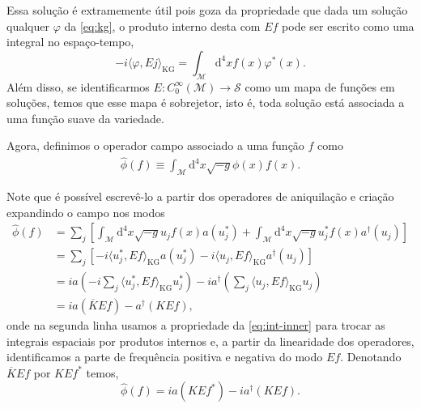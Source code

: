 \documentclass[12pt]{article}
\newcommand{\m}{\mathcal{M}}
\newcommand{\s}{\mathcal{S}}
\newcommand{\dd}{\mathrm{d}}
\newcommand{\innerkg}[2]{\langle#1,#2\rangle_{\text{KG}}}
\begin{document}
Essa solução é extramemente útil pois goza da propriedade que dada um solução qualquer \(\varphi\) da \cref{eq:kg}, o produto interno desta com \(Ef\) pode ser escrito como uma integral no espaço-tempo,
\begin{equation}
    -i\innerkg{\varphi}{Ej}=\int_\m\dd^4xf(x)\varphi^*(x).
    \label{eq:int-inner}
\end{equation}
Além disso, se identificarmos \(E:C_0^{\infty}(\m)\to\s\) como um mapa de funções em soluções, temos que esse mapa é sobrejetor, isto é, toda solução está associada a uma função suave da variedade.

Agora, definimos o operador campo associado a uma função \(f\) como
\begin{subequations}
    \begin{align}
        \hat{\phi}(f)\equiv\int_\m\dd^4x\sqrt{-g}\phi(x)f(x).
    \end{align}
\end{subequations}

Note que é possível escrevê-lo a partir dos operadores de aniquilação e criação expandindo o campo nos modos
\begin{subequations}
    \begin{align}
        \hat{\phi}(f)&=\sum_j\left[\int_\m\dd^4x\sqrt{-g}u_jf(x)a(u_j^*)+\int_\m\dd^4x\sqrt{-g}u_j^*f(x)a^{\dagger}(u_j)\right]\\
        &=\sum_j\left[-i\innerkg{u_j^*}{Ef}a(u_j^*)-i\innerkg{u_j}{Ef}a^\dagger(u_j)\right]\\
        &=ia\left(-i\sum_j\innerkg{u_j^*}{Ef}u^*_j\right)-ia^\dagger\left(\sum_j\innerkg{u_j}{Ef}u_j\right)\\
        &=ia\left(\overline{K}Ef\right)-a^\dagger\left(KEf\right),
    \end{align}
\end{subequations}
onde na segunda linha usamos a propriedade da \cref{eq:int-inner} para trocar as integrais espaciais por produtos internos e, a partir da linearidade dos operadores, identificamos a parte de frequência positiva e negativa do modo \(Ef\). Denotando \(\overline{K}Ef\) por \(KEf^*\) temos,
\begin{equation}
    \hat{\phi}(f)=ia\left(KEf^*\right)-ia^\dagger\left(KEf\right).
\end{equation}
\end{document}
